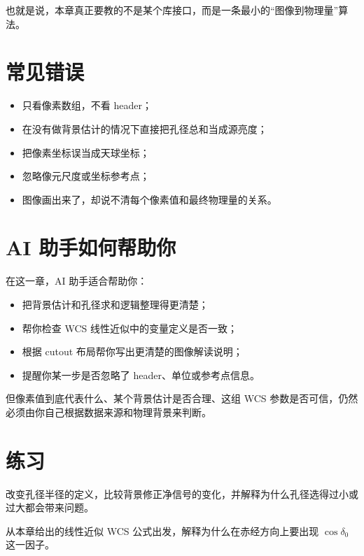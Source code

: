 也就是说，本章真正要教的不是某个库接口，而是一条最小的“图像到物理量”算法。

\section{常见错误}

\begin{warnbox}
\begin{itemize}
    \item 只看像素数组，不看 header；
    \item 在没有做背景估计的情况下直接把孔径总和当成源亮度；
    \item 把像素坐标误当成天球坐标；
    \item 忽略像元尺度或坐标参考点；
    \item 图像画出来了，却说不清每个像素值和最终物理量的关系。
\end{itemize}
\end{warnbox}

\section{AI 助手如何帮助你}

在这一章，AI 助手适合帮助你：

\begin{itemize}
    \item 把背景估计和孔径求和逻辑整理得更清楚；
    \item 帮你检查 WCS 线性近似中的变量定义是否一致；
    \item 根据 cutout 布局帮你写出更清楚的图像解读说明；
    \item 提醒你某一步是否忽略了 header、单位或参考点信息。
\end{itemize}

但像素值到底代表什么、某个背景估计是否合理、这组 WCS 参数是否可信，仍然必须由你自己根据数据来源和物理背景来判断。

\section{练习}

\begin{exercisebox}[基础练习]
改变孔径半径的定义，比较背景修正净信号的变化，并解释为什么孔径选得过小或过大都会带来问题。
\end{exercisebox}

\begin{exercisebox}[进阶练习]
从本章给出的线性近似 WCS 公式出发，解释为什么在赤经方向上要出现 $\cos \delta_0$ 这一因子。
\end{exercisebox}

